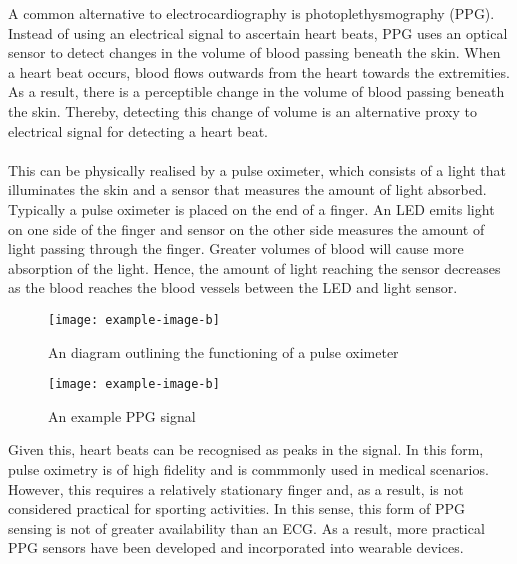 A common alternative to electrocardiography is photoplethysmography (PPG).
Instead of using an electrical signal to ascertain heart beats, PPG uses an optical sensor to detect changes in the volume of blood passing beneath the skin.
When a heart beat occurs, blood flows outwards from the heart towards the extremities. As a result, there is a perceptible change in the volume of blood passing beneath the skin. Thereby, detecting this change of volume is an alternative proxy to electrical signal for detecting a heart beat.
\\\\
This can be physically realised by a pulse oximeter, which consists of a light that illuminates the skin and a sensor that measures the amount of light absorbed. Typically a pulse oximeter is placed on the end of a finger. An LED emits light on one side of the finger and sensor on the other side measures the amount of light passing through the finger.
Greater volumes of blood will cause more absorption of the light. 
Hence, the amount of light reaching the sensor decreases as the blood reaches the blood vessels between the LED and light sensor.
\begin{figure}[H]
    \texttt{[image: example-image-b]}
   \caption{An diagram outlining the functioning of a pulse oximeter} 
\end{figure}
\noindent
\begin{figure}[H]
    \texttt{[image: example-image-b]}
   \caption{An example PPG signal} 
\end{figure}
\noindent
Given this, heart beats can be recognised as peaks in the signal. In this form, pulse oximetry is of high fidelity and is commmonly used in medical scenarios.
However, this requires a relatively stationary finger and, as a result, is not considered practical for sporting activities. In this sense, this form of PPG sensing is not of greater availability than an ECG. As a result, more practical PPG sensors have been developed and incorporated into wearable devices. 

